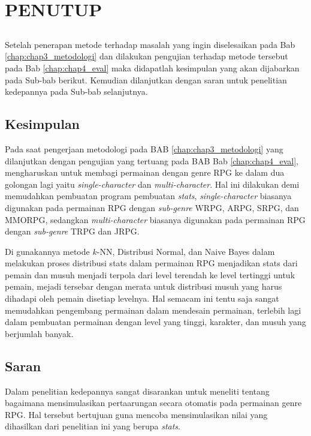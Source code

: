 \chapter{PENUTUP}
\label{sec:chap5_tutup}
\vspace{1ex}

\section*{}
Setelah penerapan metode terhadap masalah yang ingin diselesaikan pada Bab \ref{chap:chap3_metodologi} dan dilakukan pengujian terhadap metode tersebut pada Bab \ref*{chap:chap4_eval} maka didapatlah kesimpulan yang akan dijabarkan pada Sub-bab berikut. Kemudian dilanjutkan dengan saran untuk penelitian kedepannya pada Sub-bab selanjutnya.
\vspace{1ex}

\section{Kesimpulan}
\label{sec:sec4_kesimpulan}
\vspace{1ex}

Pada saat pengerjaan metodologi pada BAB \ref{chap:chap3_metodologi} yang dilanjutkan dengan pengujian yang tertuang pada BAB Bab \ref*{chap:chap4_eval}, mengharuskan untuk membagi permainan dengan genre RPG ke dalam dua golongan lagi yaitu \textit{single-character} dan \textit{multi-character}. Hal ini dilakukan demi memudahkan pembuatan program pembuatan \textit{stats}, \textit{single-character} biasanya digunakan pada permainan RPG dengan \textit{sub-genre} WRPG, ARPG, SRPG, dan MMORPG, sedangkan \textit{multi-character} biasanya digunakan pada permainan RPG dengan \textit{sub-genre} TRPG dan JRPG.
\vspace{1ex}

Di gunakannya metode $k$-NN, Distribusi Normal, dan Naive Bayes dalam melakukan proses distribusi stats dalam permainan RPG menjadikan stats dari pemain dan musuh menjadi terpola dari level terendah ke level tertinggi untuk pemain, mejadi tersebar dengan merata untuk distribusi musuh yang harus dihadapi oleh pemain disetiap levelnya. Hal semacam ini tentu saja sangat memudahkan pengembang permainan dalam mendesain permainan, terlebih lagi dalam pembuatan permainan dengan level yang tinggi, karakter, dan musuh yang berjumlah banyak.
\vspace{1ex}

\section{Saran}
\label{sec:sec4_saran}
\vspace{1ex}

Dalam penelitian kedepannya sangat disarankan untuk meneliti tentang bagaimana mensimulasikan pertaarungan secara otomatis pada permainan genre RPG. Hal tersebut bertujuan guna mencoba mensimulasikan nilai yang dihasilkan dari penelitian ini yang berupa \textit{stats}.
